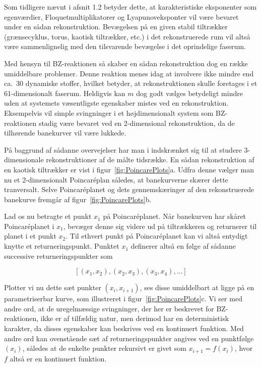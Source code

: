 \vspace{4.0mm}
Som tidligere n{\ae}vnt i afsnit 1.2 betyder dette, at
karakteristiske eksponenter som egenv{\ae}rdier,
Floquetmultiplikatorer og Lyapunoveksponter vil v{\ae}re
bevaret under en s{\aa}dan rekonstruktion. Bev{\ae}gelsen
p{\aa} en given stabil tiltr{\ae}kker (gr{\ae}nsecyklus,
torus, kaotisk tiltr{\ae}kker, etc.) i det rekonstruerede
rum vil alts{\aa} v{\ae}re sammenlignelig med den
tilsvarende bev{\ae}gelse i det oprindelige faserum.

\vspace{4.0mm}
Med hensyn til BZ-reaktionen s{\aa} skaber en s{\aa}dan
rekonstruktion dog en r{\ae}kke umiddelbare problemer.
Denne reaktion menes idag at involvere ikke mindre end
ca.\ 30 dynamiske stoffer, hvilket betyder, at
rekonstruktionen skulle foretages i et 61-dimensionalt
faserum. Heldigvis kan $m$ dog godt v{\ae}lges betydeligt
mindre uden at systemets v{\ae}sentligste egenskaber mistes
ved en rekonstruktion. Eksempelvis vil simple svingninger i
et h{\o}jdimensionalt system som BZ-reaktionen stadig
v{\ae}re bevaret ved en 2-dimensional rekonstruktion, da de
tilh{\o}rende banekurver vil v{\ae}re lukkede.

\vspace{4.0mm}
P{\aa} baggrund af s{\aa}danne overvejelser har man i
\cite{Swinney} indskr{\ae}nket sig til at studere
3-dimensionale rekonstruktioner af de m{\aa}lte
tidsr{\ae}kke. En s{\aa}dan rekonstruktion af en kaotisk
tiltr{\ae}kker er vist i figur~\ref{fig:PoincarePlots}a.
Udfra denne v{\ae}lger man nu et 2-dimensionalt
Poincar\'{e}plan s{\aa}ledes, at banekurverne sk{\ae}rer
dette tranversalt. Selve Poincar\'{e}planet og dets
gennemsk{\ae}ringer af den rekonstruerede banekurve
fremg{\aa}r af figur~\ref{fig:PoincarePlots}b.

\vspace{4.0mm}
Lad os nu betragte et punkt $x_1$ p{\aa} Poincar\'{e}planet.
N{\aa}r banekurven har sk{\aa}ret Poincar\'{e}planet i $x_1$,
bev{\ae}ger denne sig videre ud p{\aa} tiltr{\ae}kkeren og
returnerer til planet i et punkt $x_2$. Til ethvert punkt
p{\aa} Poincar\'{e}planet kan vi alts{\aa} entydigt knytte et
returneringspunkt. Punktet $x_1$ definerer alts{\aa} en
f{\o}lge af s{\aa}danne successive returneringspunkter som

\begin{equation}
  \left[ (x_1,x_2), (x_2,x_3), (x_3,x_4), \ldots \right]
\end{equation}

Plotter vi nu dette s{\ae}t punkter $(x_i,x_{i+1})$, ses
disse umiddelbart at ligge p{\aa} en parametriserbar kurve,
som illustreret i figur~\ref{fig:PoincarePlots}c. Vi ser
med andre ord, at de uregelm{\ae}ssige svingninger, der her
er beskrevet for BZ-reaktionen, ikke er af tilf{\ae}ldig
natur, men derimod har en deterministisk karakter, da
disses egenskaber kan beskrives ved en kontinuert funktion.
Med andre ord kan ovenst{\aa}ende s{\ae}t af
returneringspunkter angives ved en punktf{\o}lge $(x_i)$,
s{\aa}ledes at de enkelte punkter rekursivt er givet som
$x_{i+1} = f(x_i)$, hvor $f$ alts{\aa} er en kontinuert
funktion.

